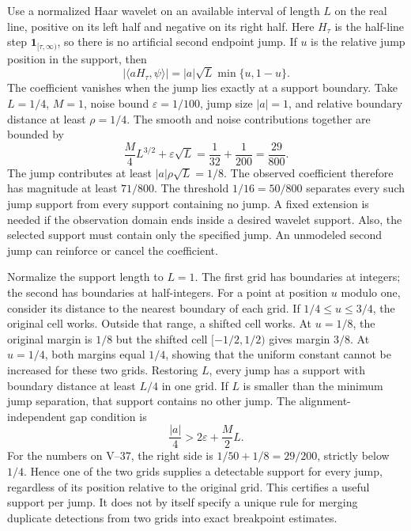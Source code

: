 Use a normalized Haar wavelet on an available interval of length $L$ on the real line, positive on its left half and negative on its right half. Here $H_\tau$ is the half-line step $\mathbf1_{[\tau,\infty)}$, so there is no artificial second endpoint jump.
If $u$ is the relative jump position in the support, then
\[
|\langle aH_\tau,\psi\rangle|
=|a|\sqrt L\min\{u,1-u\}.
\]
The coefficient vanishes when the jump lies exactly at a support boundary.
Take $L=1/4$, $M=1$, noise bound $\varepsilon=1/100$, jump size $|a|=1$, and relative boundary distance at least $\rho=1/4$. The smooth and noise contributions together are bounded by
\[
\frac M4L^{3/2}+\varepsilon\sqrt L
=\frac1{32}+\frac1{200}=\frac{29}{800}.
\]
The jump contributes at least $|a|\rho\sqrt L=1/8$. The observed coefficient therefore has magnitude at least $71/800$. The threshold $1/16=50/800$ separates every such jump support from every support containing no jump.
A fixed extension is needed if the observation domain ends inside a desired wavelet support. Also, the selected support must contain only the specified jump. An unmodeled second jump can reinforce or cancel the coefficient.

Normalize the support length to $L=1$. The first grid has boundaries at integers; the second has boundaries at half-integers. For a point at position $u$ modulo one, consider its distance to the nearest boundary of each grid.
If $1/4\le u\le3/4$, the original cell works. Outside that range, a shifted cell works. At $u=1/8$, the original margin is $1/8$ but the shifted cell $[-1/2,1/2)$ gives margin $3/8$. At $u=1/4$, both margins equal $1/4$, showing that the uniform constant cannot be increased for these two grids.
Restoring $L$, every jump has a support with boundary distance at least $L/4$ in one grid. If $L$ is smaller than the minimum jump separation, that support contains no other jump.
The alignment-independent gap condition is
\[
\frac{|a|}{4}>2\varepsilon+\frac M2L.
\]
For the numbers on V--37, the right side is $1/50+1/8=29/200$, strictly below $1/4$. Hence one of the two grids supplies a detectable support for every jump, regardless of its position relative to the original grid.
This certifies a useful support per jump. It does not by itself specify a unique rule for merging duplicate detections from two grids into exact breakpoint estimates.

